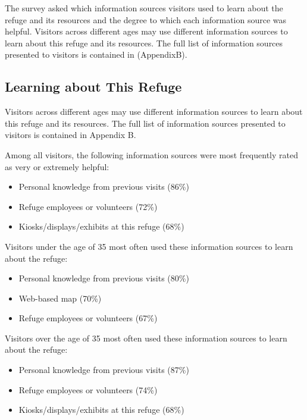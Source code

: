 \documentclass[]{book}
\providecommand{\tightlist}{%
  \setlength{\itemsep}{0pt}\setlength{\parskip}{0pt}}
\begin{document}
The survey asked which information sources visitors used to learn about
the refuge and its resources and the degree to which each information
source was helpful. Visitors across different ages may use different
information sources to learn about this refuge and its resources. The
full list of information sources presented to visitors is contained in
(AppendixB).

\hypertarget{left}{}
\subsection*{Learning about This
Refuge}\label{learning-about-this-refuge-1}

Visitors across different ages may use different information sources to
learn about this refuge and its resources. The full list of information
sources presented to visitors is contained in Appendix B.

Among all visitors, the following information sources were most
frequently rated as very or extremely helpful:

\begin{itemize}
\tightlist
\item
  Personal knowledge from previous visits (86\%)
\item
  Refuge employees or volunteers (72\%)
\item
  Kiosks/displays/exhibits at this refuge (68\%)
\end{itemize}

Visitors under the age of 35 most often used these information sources
to learn about the refuge:

\begin{itemize}
\tightlist
\item
  Personal knowledge from previous visits (80\%)
\item
  Web-based map (70\%)
\item
  Refuge employees or volunteers (67\%)
\end{itemize}

Visitors over the age of 35 most often used these information sources to
learn about the refuge:

\begin{itemize}
\tightlist
\item
  Personal knowledge from previous visits (87\%)
\item
  Refuge employees or volunteers (74\%)
\item
  Kiosks/displays/exhibits at this refuge (68\%)
\end{itemize}
\end{document}
